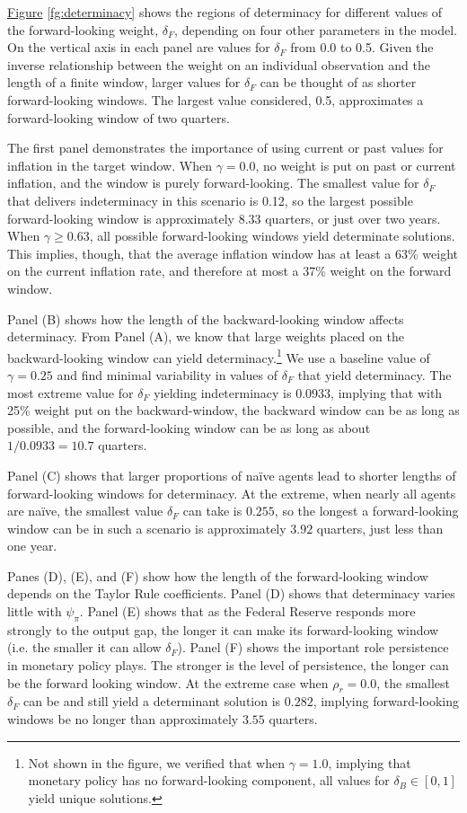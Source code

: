 \documentclass[english,authoryear,12pt]{elsarticle}
\begin{document}
\href{fg:determinacy}{Figure} \ref{fg:determinacy} shows the regions of determinacy for different values of the forward-looking weight, $\delta_F$, depending on four other parameters in the model. On the vertical axis in each panel are values for $\delta_F$ from 0.0 to 0.5. Given the inverse relationship between the weight on an individual observation and the length of a finite window, larger values for $\delta_F$ can be thought of as shorter forward-looking windows. The largest value considered, 0.5, approximates a forward-looking window of two quarters.

The first panel demonstrates the importance of using current or past values for inflation in the target window. When $\gamma=0.0$, no weight is put on past or current inflation, and the window is purely forward-looking. The smallest value for $\delta_F$ that delivers indeterminacy in this scenario is 0.12, so the largest possible forward-looking window is approximately 8.33 quarters, or just over two years. When $\gamma \geq 0.63$, all possible forward-looking windows yield determinate solutions. This implies, though, that the average inflation window has at least a 63\% weight on the current inflation rate, and therefore at most a 37\% weight on the forward window.

Panel (B) shows how the length of the backward-looking window affects determinacy. From Panel (A), we know that large weights placed on the backward-looking window can yield determinacy.\footnote{Not shown in the figure, we verified that when $\gamma=1.0$, implying that monetary policy has no forward-looking component, all values for $\delta_B\in[0,1]$ yield unique solutions.} We use a baseline value of $\gamma=0.25$ and find minimal variability in values of $\delta_F$ that yield determinacy. The most extreme value for $\delta_F$ yielding indeterminacy is 0.0933, implying that with 25\% weight put on the backward-window, the backward window can be as long as possible, and the forward-looking window can be as long as about $1/0.0933 = 10.7$ quarters.

Panel (C) shows that larger proportions of na\"ive agents lead to shorter lengths of forward-looking windows for determinacy. At the extreme, when nearly all agents are na\"ive, the smallest value $\delta_F$ can take is $0.255$, so the longest a forward-looking window can be in such a scenario is approximately $3.92$ quarters, just less than one year.

Panes (D), (E), and (F) show how the length of the forward-looking window depends on the Taylor Rule coefficients. Panel (D) shows that determinacy varies little with $\psi_\pi$. Panel (E) shows that as the Federal Reserve responds more strongly to the output gap, the longer it can make its forward-looking window (i.e. the smaller it can allow $\delta_F$). Panel (F) shows the important role persistence in monetary policy plays. The stronger is the level of persistence, the longer can be the forward looking window. At the extreme case when $\rho_r=0.0$, the smallest $\delta_F$ can be and still yield a determinant solution is $0.282$, implying forward-looking windows be no longer than approximately $3.55$ quarters.
\end{document}
